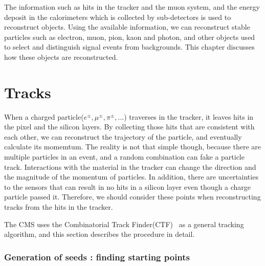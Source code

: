 
The information such as hits in the tracker and the muon system,
and the energy deposit in the calorimeters which is collected by 
sub-detectors is used to reconstruct objects. Using the available 
information, we can reconstruct stable particles such as 
electron, muon, pion, kaon and photon, and other objects 
used to select and distinguish signal events from backgrounds. 
This chapter discusses how these objects are reconstructed. 

\section{ Tracks }
\label{sec:track}

When a charged particle($e^\pm, \mu^\pm, \pi^\pm, ... $) traverses in the tracker,
it leaves hits in the pixel and the silicon layers. By collecting those hits
that are consistent with each other, we can reconstruct the 
trajectory of the particle, and eventually calculate its momemtum. 
The reality is not that simple though, because there are multiple 
particles in an event, and a random combination can fake a particle track.  
Interactions with the material in the tracker can change the 
direction and the magnitude of the momentum of particles. 
In addition, there are uncertainties to the sensors that 
can result in no hits in a silicon layer even though a charge 
particle passed it. Therefore, we should consider these points 
when reconstructing tracks from the hits in the tracker. 

The CMS uses the Combinatorial Track Finder(CTF)~\cite{} as a general tracking 
algorithm, and this section describes the procedure in detail.


\subsubsection{Generation of seeds : finding starting points}

